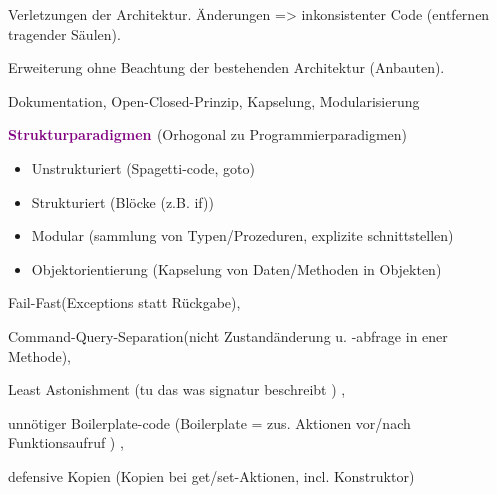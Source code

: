 Verletzungen der Architektur. Änderungen => inkonsistenter Code (entfernen tragender Säulen).

Erweiterung ohne Beachtung der bestehenden Architektur (Anbauten).

 Dokumentation, Open-Closed-Prinzip, Kapselung, Modularisierung

\newpage
\textbf{\textcolor{purple}{Strukturparadigmen }} (Orhogonal zu Programmierparadigmen)
\begin{itemize}
\item Unstrukturiert (Spagetti-code, goto)
\item Strukturiert (Blöcke (z.B. if))
\item Modular (sammlung von Typen/Prozeduren, explizite schnittstellen)
\item Objektorientierung (Kapselung von Daten/Methoden in Objekten)
\end{itemize}

Fail-Fast(Exceptions statt Rückgabe), 

Command-Query-Separation(nicht Zustandänderung u. -abfrage in ener Methode), 

Least Astonishment (tu das was signatur beschreibt ) , 

unnötiger Boilerplate-code (Boilerplate = zus. Aktionen vor/nach Funktionsaufruf ) , 

defensive Kopien (Kopien bei get/set-Aktionen, incl. Konstruktor)


